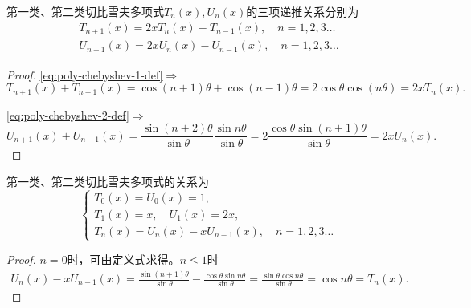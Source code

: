 \begin{subappendices}
\begin{theorem}[切比雪夫多项式的三项递推关系]
  第一类、第二类切比雪夫多项式$T_n(x), U_n(x)$的三项递推关系分别为
  \begin{align}
    \label{eq:poly-chebyshev-1-three-term-recurrence-relation}
    T_{n+1}(x) = 2x T_n(x) - T_{n-1}(x), \quad n=1,2,3 \ldots \\
    \label{eq:poly-chebyshev-2-three-term-recurrence-relation}
    U_{n+1}(x) = 2x U_n(x) - U_{n-1}(x), \quad n=1,2,3 \ldots
  \end{align}
\end{theorem}
\begin{proof}
  \eqref{eq:poly-chebyshev-1-def}$\Rightarrow$
  \begin{equation*}
    T_{n+1}(x) + T_{n-1}(x) = \cos(n+1) \theta + \cos(n-1) \theta = 2 \cos \theta \cos(n \theta) = 2 x T_n(x).
  \end{equation*}

  \eqref{eq:poly-chebyshev-2-def}$\Rightarrow$
  \begin{equation*}
    U_{n+1}(x) + U_{n-1}(x) = \frac{\sin(n+2) \theta}{\sin \theta} \frac{\sin n \theta}{\sin \theta} = 2 \frac{\cos \theta \sin(n+1) \theta}{\sin \theta} = 2 x U_n(x).
  \end{equation*}
\end{proof}

\begin{theorem}
  第一类、第二类切比雪夫多项式的关系为
  \begin{equation}
    \begin{cases}
      T_0(x) = U_0(x) = 1, \\
      T_1(x) = x, \quad U_1(x) = 2x, \\
      T_n(x) = U_n(x) - x U_{n-1}(x), \quad n=1,2,3\ldots
    \end{cases}
  \end{equation}
\end{theorem}
\begin{proof}
  $n=0$时，可由定义式求得。$n\le 1$时
  \begin{equation*}
    \begin{split}
      U_n(x) - x U_{n-1}(x) = \frac{\sin(n+1) \theta}{\sin \theta} - \frac{\cos \theta \sin n \theta}{\sin \theta} = \frac{\sin \theta \cos n \theta}{\sin \theta} = \cos n \theta = T_n(x).
    \end{split}
  \end{equation*}
\end{proof}




\end{subappendices}
